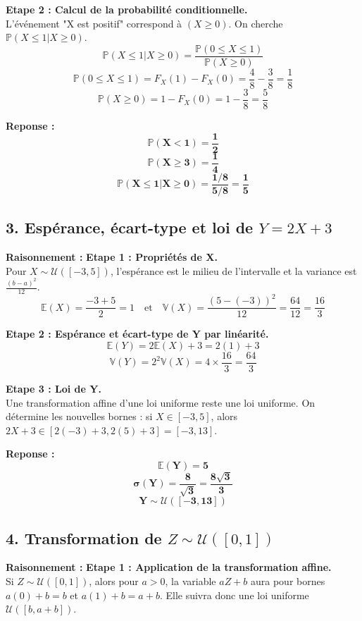 \documentclass[11pt,a4paper]{article}
\begin{document}
\textbf{Etape 2 : Calcul de la probabilité conditionnelle.}\\
L'événement "X est positif" correspond à $(X \ge 0)$. On cherche $\mathbb{P}(X \le 1 | X \ge 0)$.
$$ \mathbb{P}(X \le 1 | X \ge 0) = \frac{\mathbb{P}(0 \le X \le 1)}{\mathbb{P}(X \ge 0)} $$
$$ \mathbb{P}(0 \le X \le 1) = F_X(1) - F_X(0) = \frac{4}{8} - \frac{3}{8} = \frac{1}{8} $$
$$ \mathbb{P}(X \ge 0) = 1 - F_X(0) = 1 - \frac{3}{8} = \frac{5}{8} $$

\textbf{Reponse :}
$$ \mathbf{\mathbb{P}(X < 1) = \frac{1}{2}} $$
$$ \mathbf{\mathbb{P}(X \ge 3) = \frac{1}{4}} $$
$$ \mathbf{\mathbb{P}(X \le 1 | X \ge 0) = \frac{1/8}{5/8} = \frac{1}{5}} $$

\subsection*{3. Espérance, écart-type et loi de $Y = 2X+3$}

\textbf{Raisonnement :}
\textbf{Etape 1 : Propriétés de X.}\\
Pour $X \sim \mathcal{U}([-3, 5])$, l'espérance est le milieu de l'intervalle et la variance est $\frac{(b-a)^2}{12}$.
$$ \mathbb{E}(X) = \frac{-3+5}{2} = 1 \quad \text{et} \quad \mathbb{V}(X) = \frac{(5 - (-3))^2}{12} = \frac{64}{12} = \frac{16}{3} $$

\textbf{Etape 2 : Espérance et écart-type de Y par linéarité.}\\
$$ \mathbb{E}(Y) = 2\mathbb{E}(X) + 3 = 2(1) + 3 $$
$$ \mathbb{V}(Y) = 2^2 \mathbb{V}(X) = 4 \times \frac{16}{3} = \frac{64}{3} $$

\textbf{Etape 3 : Loi de Y.}\\
Une transformation affine d'une loi uniforme reste une loi uniforme.
On détermine les nouvelles bornes : si $X \in [-3, 5]$, alors $2X+3 \in [2(-3)+3, 2(5)+3] = [-3, 13]$.

\textbf{Reponse :}
$$ \mathbf{\mathbb{E}(Y) = 5} $$
$$ \mathbf{\sigma(Y) = \frac{8}{\sqrt{3}} = \frac{8\sqrt{3}}{3}} $$
$$ \mathbf{Y \sim \mathcal{U}([-3, 13])} $$

\subsection*{4. Transformation de $Z \sim \mathcal{U}([0,1])$}

\textbf{Raisonnement :}
\textbf{Etape 1 : Application de la transformation affine.}\\
Si $Z \sim \mathcal{U}([0,1])$, alors pour $a > 0$, la variable $aZ+b$ aura pour bornes $a(0)+b = b$ et $a(1)+b = a+b$. Elle suivra donc une loi uniforme $\mathcal{U}([b, a+b])$.
\end{document}
